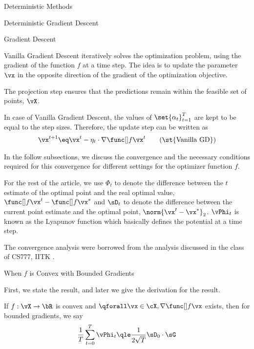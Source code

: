 \documentclass{article}
\begin{document}
\begin{psection}{Deterministic Methods}
\begin{algo}[0.9\textwidth]{Deterministic Gradient Descent}
	\end{algo}

	\begin{psubsection}{Gradient Descent}

		Vanilla Gradient Descent iteratively solves the optimization problem, using the gradient of the function $f$ at a time step. The idea is to update the parameter $\vx$ in the opposite direction of the gradient of the optimization objective.

		The projection step ensures that the predictions remain within the feasible set of points, \ie $\vX$.

		In case of Vanilla Gradient Descent, the values of $\set{\alpha_t}_{t = 1}^T$ are kept to be equal to the step sizes. Therefore, the update step can be written as
		\begin{align}
			\x{t+1}	\eq	\x{t} - \eta_t \cdot \gf{t}
			\tag{\st{Vanilla GD}}
			\label{eq:vgd}
		\end{align}

		In the follow subsections, we discuss the convergence and the necessary conditions required for this convergence for different settings for the optimizer function $f$.

		\begin{note}
			For the rest of the article, we use $\Phi_t$ to denote the difference between the $t$\tth estimate of the optimal point and the real optimal value, \ie $\f{t} - \fs$ and $\sD_t$ to denote the difference between the current point estimate and the optimal point, \ie $\norm{\x{t} - \xs}_2$. $\vPhi_t$ is known as the Lyapunov function which basically defines the potential at a time step.
		\end{note}

		The convergence analysis were borrowed from the analysis discussed in the class of CS777, IITK \cite{gd}.

		\begin{pssubsection}{When $f$ is Convex with Bounded Gradients}

			First, we state the result, and later we give the derivation for the result.

			\begin{theorem}
				If $f : \vX \to \bR$ is convex and $\qforall \vx \in \cX, \ggf$ exists, then for bounded gradients, we say
				\begin{align}
					\frac{1}{T} \sum_{t = 0}^T \vPhi_t \qle \frac{1}{2\sqrt{T}}\sD_0 \cdot \sG
					\label{eq:gd-cvx-bddg}
				\end{align}
				\label{th:gd-cvx-bddg}


\end{theorem}
\end{pssubsection}
\end{psubsection}
\end{psection}
\end{document}
